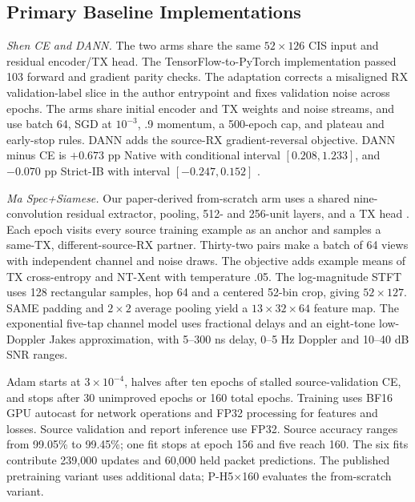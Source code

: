 \documentclass[journal]{IEEEtran}
\begin{document}
\subsection{Primary Baseline Implementations}
\textit{Shen CE and DANN.} The two arms share the same $52\times126$ CIS input and residual encoder/TX head. The TensorFlow-to-PyTorch implementation passed 103 forward and gradient parity checks. The adaptation corrects a misaligned RX validation-label slice in the author entrypoint and fixes validation noise across epochs. The arms share initial encoder and TX weights and noise streams, and use batch 64, SGD at $10^{-3}$, .9 momentum, a 500-epoch cap, and plateau and early-stop rules. DANN adds the source-RX gradient-reversal objective. DANN minus CE is \(+0.673\) pp Native with conditional interval \([0.208,1.233]\), and \(-0.070\) pp Strict-IB with interval \([-0.247,0.152]\) \cite{shen2024receiver}.

\textit{Ma Spec+Siamese.} Our paper-derived from-scratch arm uses a shared nine-convolution residual extractor, pooling, 512- and 256-unit layers, and a TX head \cite{ma2025robust}. Each epoch visits every source training example as an anchor and samples a same-TX, different-source-RX partner. Thirty-two pairs make a batch of 64 views with independent channel and noise draws. The objective adds example means of TX cross-entropy and NT-Xent with temperature .05. The log-magnitude STFT uses 128 rectangular samples, hop 64 and a centered 52-bin crop, giving \(52\times127\). SAME padding and \(2\times2\) average pooling yield a \(13\times32\times64\) feature map. The exponential five-tap channel model uses fractional delays and an eight-tone low-Doppler Jakes approximation, with 5--300 ns delay, 0--5 Hz Doppler and 10--40 dB SNR ranges.

Adam starts at \(3\times10^{-4}\), halves after ten epochs of stalled source-validation CE, and stops after 30 unimproved epochs or 160 total epochs. Training uses BF16 GPU autocast for network operations and FP32 processing for features and losses. Source validation and report inference use FP32. Source accuracy ranges from 99.05\% to 99.45\%; one fit stops at epoch 156 and five reach 160. The six fits contribute 239,000 updates and 60,000 held packet predictions. The published pretraining variant uses additional data; P-H5\(\times\)160 evaluates the from-scratch variant.
\end{document}
